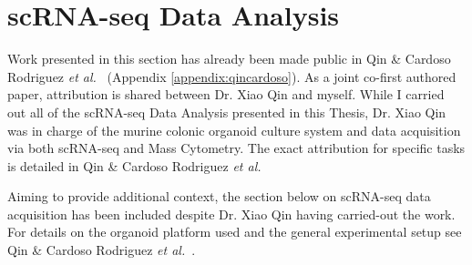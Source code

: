     


\newpage
\section{scRNA-seq Data Analysis}

Work presented in this section has already been made public in Qin \& Cardoso Rodriguez \emph{et al.}~\cite{cardoso_rodriguez_single-cell_2023} (Appendix \ref{appendix:qincardoso}). As a joint co-first authored paper, attribution is shared between Dr. Xiao Qin and myself. While I carried out all of the scRNA-seq Data Analysis presented in this Thesis, Dr. Xiao Qin was in charge of the murine colonic organoid culture system and data acquisition via both scRNA-seq and Mass Cytometry. The exact attribution for specific tasks is detailed in Qin \& Cardoso Rodriguez \emph{et al.} 

Aiming to provide additional context, the section below on scRNA-seq data acquisition has been included despite Dr. Xiao Qin having carried-out the work. For details on the organoid platform used and the general experimental setup see Qin \& Cardoso Rodriguez \emph{et al.}~\cite{cardoso_rodriguez_single-cell_2023}.

